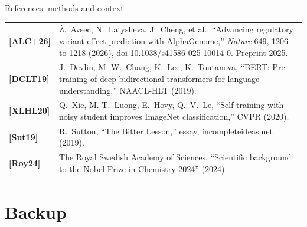 \documentclass[11pt,aspectratio=169]{beamer}
\begin{document}
\begin{frame}[t]{References: methods and context}
  \vspace{-2mm}
  \scriptsize
  \renewcommand{\arraystretch}{1.25}
  \setlength{\tabcolsep}{1.2mm}
  \begin{tabular}{@{}l>{\raggedright\arraybackslash}p{}@{}}
    \textbf{[ALC+26]} & \v{Z}.~Avsec, N.~Latysheva, J.~Cheng, et al., ``Advancing regulatory variant effect prediction with AlphaGenome,'' \textit{Nature} 649, 1206 to 1218 (2026), doi 10.1038/s41586-025-10014-0. Preprint 2025. \\
    \textbf{[DCLT19]} & J.~Devlin, M.-W.~Chang, K.~Lee, K.~Toutanova, ``BERT: Pre-training of deep bidirectional transformers for language understanding,'' NAACL-HLT (2019). \\
    \textbf{[XLHL20]} & Q.~Xie, M.-T.~Luong, E.~Hovy, Q.~V.~Le, ``Self-training with noisy student improves ImageNet classification,'' CVPR (2020). \\
    \textbf{[Sut19]} & R.~Sutton, ``The Bitter Lesson,'' essay, incompleteideas.net (2019). \\
    \textbf{[Roy24]} & The Royal Swedish Academy of Sciences, ``Scientific background to the Nobel Prize in Chemistry 2024'' (2024). \\
  \end{tabular}
\end{frame}

\appendix
\section{Backup}
\end{document}
